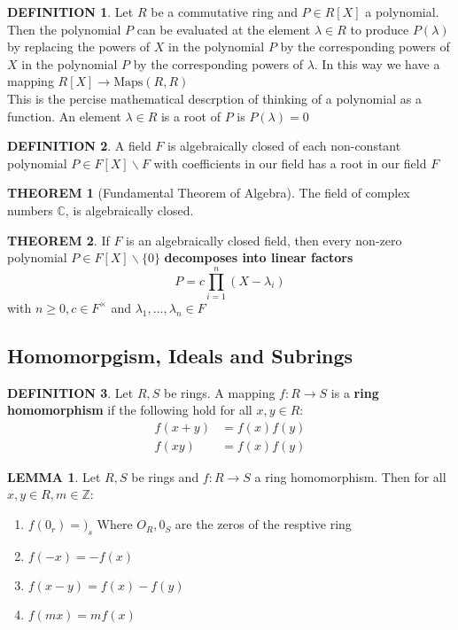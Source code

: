 \documentclass[12pt]{article}
\theoremstyle{definition}
\newtheorem{definition}{DEFINITION}[subsection]
\newtheorem{theorem}{THEOREM}[subsection]
\newcommand{\Maps}{\text{Maps}}
\newtheorem{lemma}{LEMMA}[subsection]
\begin{document}
\begin{definition}
    Let $R$ be a commutative ring and $P\in R[X]$ a polynomial. Then the polynomial $P$ can be evaluated at the element $\lambda \in R$ to produce $P(\lambda)$ by replacing the powers of $X$ in the polynomial $P$ by the corresponding powers of $X$ in the polynomial $P$ by the corresponding powers of $\lambda$. In this way we have a mapping $R[X]\rightarrow\Maps(R,R)$\\This is the percise mathematical descrption of thinking of a polynomial as a function. An element $\lambda \in R$ is a root of $P$ is $P(\lambda) = 0$
\end{definition}

\begin{definition}
    A field $F$ is algebraically closed of each non-constant polynomial $P \in F[X]\backslash F$ with coefficients in our field has a root in our field $F$
\end{definition}

\begin{theorem}[Fundamental Theorem of Algebra]
    The field of complex numbers $\mathbb{C}$, is algebraically closed.
\end{theorem}

\begin{theorem}
    If $F$ is an algebraically closed field, then every non-zero polynomial $P\in F[X]\backslash\{0\}$ \textbf{decomposes into linear factors}
    $$P = c\prod_{i=1}^n{(X-\lambda_i)}$$
    with $n \geq 0, c\in F^\times$ and $\lambda_1,...,\lambda_n\in F$
\end{theorem}

\subsection{Homomorpgism, Ideals and Subrings}
\begin{definition}
    Let $R,S$ be rings. A mapping $f:R\rightarrow S$ is a \textbf{ring homomorphism} if the following hold for all $x,y \in R$:
    \[\begin{split}
        f(x+y) &= f(x)f(y)\\
        f(xy) &= f(x)f(y)
    \end{split}\]
\end{definition}

\begin{lemma}
    Let $R,S$ be rings and $f:R\rightarrow S$ a ring homomorphism. Then for all $x,y\in R, m\in \mathbb{Z}$:
    \begin{enumerate}
        \item $f(0_r) = )_s$ Where $O_R,0_S$ are the zeros of the resptive ring
        \item $f(-x) = -f(x)$
        \item $f(x-y) = f(x) - f(y)$
        \item $f(mx) = mf(x)$
    \end{enumerate}
\end{lemma}
\end{document}
